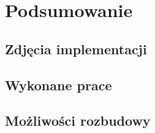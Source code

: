 \chapter{Podsumowanie}
\section{Zdjęcia implementacji}
\section{Wykonane prace}
\section{Możliwości rozbudowy}